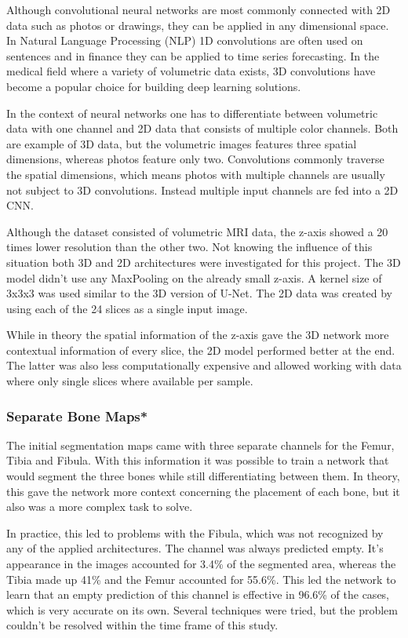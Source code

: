 Although convolutional neural networks are most commonly connected with 2D data such as photos or drawings, they can be applied in any dimensional space. In Natural Language Processing (NLP) 1D convolutions are often used on sentences and in finance they can be applied to time series forecasting. In the medical field where a variety of volumetric data exists, 3D convolutions have become a popular choice for building deep learning solutions.

In the context of neural networks one has to differentiate between volumetric data with one channel and 2D data that consists of multiple color channels. Both are example of 3D data, but the volumetric images features three spatial dimensions, whereas photos feature only two. Convolutions commonly traverse the spatial dimensions, which means photos with multiple channels are usually not subject to 3D convolutions. Instead multiple input channels are fed into a 2D CNN.

Although the dataset consisted of volumetric MRI data, the z-axis showed a 20 times lower resolution than the other two. Not knowing the influence of this situation both 3D and 2D architectures were investigated for this project. The 3D model didn't use any MaxPooling on the already small z-axis. A kernel size of 3x3x3 was used similar to the 3D version of U-Net. The 2D data was created by using each of the 24 slices as a single input image. 

While in theory the spatial information of the z-axis gave the 3D network more contextual information of every slice, the 2D model performed better at the end. The latter was also less computationally expensive and allowed working with data where only single slices where available per sample.

\subsubsection{Separate Bone Maps*}

The initial segmentation maps came with three separate channels for the Femur, Tibia and Fibula. With this information it was possible to train a network that would segment the three bones while still differentiating between them. In theory, this gave the network more context concerning the placement of each bone, but it also was a more complex task to solve. 

In practice, this led to problems with the Fibula, which was not recognized by any of the applied architectures. The channel was always predicted empty. It's appearance in the images accounted for 3.4\% of the segmented area, whereas the Tibia made up 41\% and the Femur accounted for 55.6\%. This led the network to learn that an empty prediction of this channel is effective in 96.6\% of the cases, which is very accurate on its own. Several techniques were tried, but the problem couldn't be resolved within the time frame of this study.

